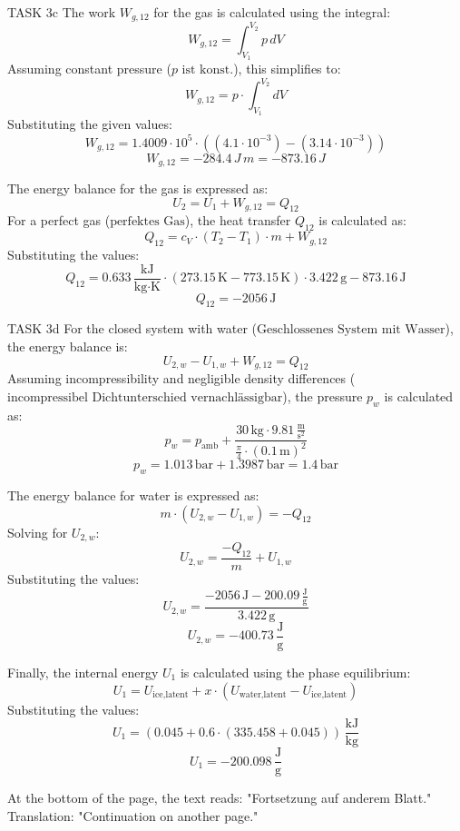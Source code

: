 TASK 3c  
The work \( W_{g,12} \) for the gas is calculated using the integral:  
\[
W_{g,12} = \int_{V_1}^{V_2} p \, dV
\]  
Assuming constant pressure (\( p \text{ ist konst.} \)), this simplifies to:  
\[
W_{g,12} = p \cdot \int_{V_1}^{V_2} dV
\]  
Substituting the given values:  
\[
W_{g,12} = 1.4009 \cdot 10^5 \cdot \left( (4.1 \cdot 10^{-3}) - (3.14 \cdot 10^{-3}) \right)
\]  
\[
W_{g,12} = -284.4 \, J \, m = -873.16 \, J
\]  

The energy balance for the gas is expressed as:  
\[
U_2 = U_1 + W_{g,12} = Q_{12}
\]  
For a perfect gas (\( \text{perfektes Gas} \)), the heat transfer \( Q_{12} \) is calculated as:  
\[
Q_{12} = c_V \cdot (T_2 - T_1) \cdot m + W_{g,12}
\]  
Substituting the values:  
\[
Q_{12} = 0.633 \, \frac{\text{kJ}}{\text{kg·K}} \cdot (273.15 \, \text{K} - 773.15 \, \text{K}) \cdot 3.422 \, \text{g} - 873.16 \, \text{J}
\]  
\[
Q_{12} = -2056 \, \text{J}
\]  

TASK 3d  
For the closed system with water (\( \text{Geschlossenes System mit Wasser} \)), the energy balance is:  
\[
U_{2,w} - U_{1,w} + W_{g,12} = Q_{12}
\]  
Assuming incompressibility and negligible density differences (\( \text{incompressibel Dichtunterschied vernachlässigbar} \)), the pressure \( p_w \) is calculated as:  
\[
p_w = p_{\text{amb}} + \frac{30 \, \text{kg} \cdot 9.81 \, \frac{\text{m}}{\text{s}^2}}{\frac{\pi}{4} \cdot (0.1 \, \text{m})^2}
\]  
\[
p_w = 1.013 \, \text{bar} + 1.3987 \, \text{bar} = 1.4 \, \text{bar}
\]  

The energy balance for water is expressed as:  
\[
m \cdot (U_{2,w} - U_{1,w}) = -Q_{12}
\]  
Solving for \( U_{2,w} \):  
\[
U_{2,w} = \frac{-Q_{12}}{m} + U_{1,w}
\]  
Substituting the values:  
\[
U_{2,w} = \frac{-2056 \, \text{J} - 200.09 \, \frac{\text{J}}{\text{g}}}{3.422 \, \text{g}}
\]  
\[
U_{2,w} = -400.73 \, \frac{\text{J}}{\text{g}}
\]  

Finally, the internal energy \( U_1 \) is calculated using the phase equilibrium:  
\[
U_1 = U_{\text{ice,latent}} + x \cdot (U_{\text{water,latent}} - U_{\text{ice,latent}})
\]  
Substituting the values:  
\[
U_1 = (0.045 + 0.6 \cdot (335.458 + 0.045)) \, \frac{\text{kJ}}{\text{kg}}
\]  
\[
U_1 = -200.098 \, \frac{\text{J}}{\text{g}}
\]  

At the bottom of the page, the text reads:  
"Fortsetzung auf anderem Blatt."  
Translation: "Continuation on another page."